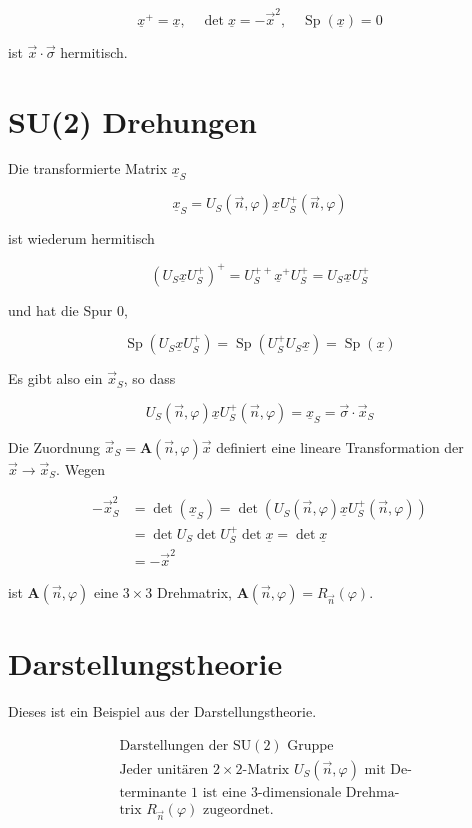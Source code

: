 \documentclass[10pt, letterpaper]{article}
\begin{document}
$$
\underline{x}^{+}=\underline{x}, \quad \operatorname{det} \underline{x}=-\vec{x}^{2}, \quad \operatorname{Sp}(\underline{x})=0
$$

ist $\vec{x} \cdot \vec{\sigma}$ hermitisch.

\section*{SU(2) Drehungen}
Die transformierte Matrix $\underline{x}_{S}$

$$
\underline{x}_{S}=U_{S}(\vec{n}, \varphi) \underline{x} U_{S}^{+}(\vec{n}, \varphi)
$$

ist wiederum hermitisch

$$
\left(U_{S} \underline{x} U_{S}^{+}\right)^{+}=U_{S}^{++} \underline{x}^{+} U_{S}^{+}=U_{S} \underline{x} U_{S}^{+}
$$

und hat die Spur 0,

$$
\operatorname{Sp}\left(U_{S} \underline{x} U_{S}^{+}\right)=\operatorname{Sp}\left(U_{S}^{+} U_{S} \underline{x}\right)=\operatorname{Sp}(\underline{x})
$$

Es gibt also ein $\vec{x}_{S}$, so dass

$$
U_{S}(\vec{n}, \varphi) \underline{x} U_{S}^{+}(\vec{n}, \varphi)=\underline{x}_{S}=\vec{\sigma} \cdot \vec{x}_{S}
$$

Die Zuordnung $\vec{x}_{S}=\mathbf{A}(\vec{n}, \varphi) \vec{x}$ definiert eine lineare Transformation der $\vec{x} \rightarrow \vec{x}_{S}$. Wegen

$$
\begin{aligned}
-\vec{x}_{S}^{2} & =\operatorname{det}\left(\underline{x}_{S}\right)=\operatorname{det}\left(U_{S}(\vec{n}, \varphi) \underline{x} U_{S}^{+}(\vec{n}, \varphi)\right) \\
& =\operatorname{det} U_{S} \operatorname{det} U_{S}^{+} \operatorname{det} \underline{x}=\operatorname{det} \underline{x} \\
& =-\vec{x}^{2}
\end{aligned}
$$

ist $\mathbf{A}(\vec{n}, \varphi)$ eine $3 \times 3$ Drehmatrix, $\mathbf{A}(\vec{n}, \varphi)=R_{\vec{n}}(\varphi)$.

\section*{Darstellungstheorie}
Dieses ist ein Beispiel aus der Darstellungstheorie.

$$
\begin{aligned}
& \text { Darstellungen der } \mathrm{SU}(2) \text { Gruppe } \\
& \text { Jeder unitären } 2 \times 2 \text {-Matrix } U_{S}(\vec{n}, \varphi) \text { mit De- } \\
& \text { terminante } 1 \text { ist eine } 3 \text {-dimensionale Drehma- } \\
& \text { trix } R_{\vec{n}}(\varphi) \text { zugeordnet. }
\end{aligned}
$$
\end{document}
